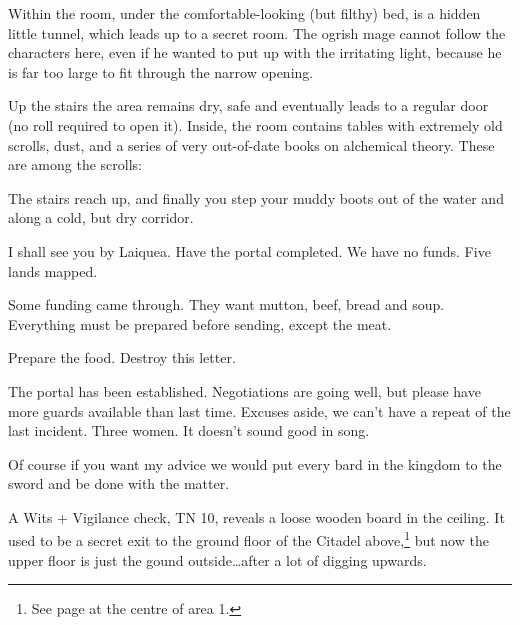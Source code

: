 \begin{multicols}{2}
Within the room, under the comfortable-looking (but filthy) bed, is a hidden little tunnel, which leads up to a secret room.
The ogrish mage cannot follow the characters here, even if he wanted to put up with the irritating light, because he is far too large to fit through the narrow opening.


Up the stairs the area remains dry, safe and eventually leads to a regular door (no roll required to open it).  Inside, the room contains tables with extremely old scrolls, dust, and a series of very out-of-date books on alchemical theory.  These are among the scrolls:

\begin{boxtext}

	The stairs reach up, and finally you step your muddy boots out of the water and along a cold, but dry corridor.

\end{boxtext}

\begin{exampletext}

	I shall see you by Laiquea.  Have the portal completed.  We have no funds.  Five lands mapped.

\end{exampletext}

\begin{exampletext}

	Some funding came through.  They want mutton, beef, bread and soup.  Everything must be prepared before sending, except the meat.

	Prepare the food.  Destroy this letter.

\end{exampletext}

\begin{exampletext}

	The portal has been established.  Negotiations are going well, but please have more guards available than last time.  Excuses aside, we can't have a repeat of the last incident.  Three women.  It doesn't sound good in song.

	Of course if you want my advice we would put every bard in the kingdom to the sword and be done with the matter.

\end{exampletext}

A Wits + Vigilance check, TN 10, reveals a loose wooden board in the ceiling.
It used to be a secret exit to the ground floor of the Citadel above,\footnote{See page \pageref{lost_citadel} at the centre of area 1.} but now the upper floor is just the gound outside\ldots after a lot of digging upwards.


\end{multicols}
